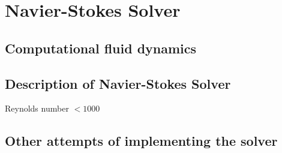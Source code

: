 \chapter{Navier-Stokes Solver}

\section{Computational fluid dynamics}

\section{Description of Navier-Stokes Solver}

Reynolds number $< 1000$

\section{Other attempts of implementing the solver}

